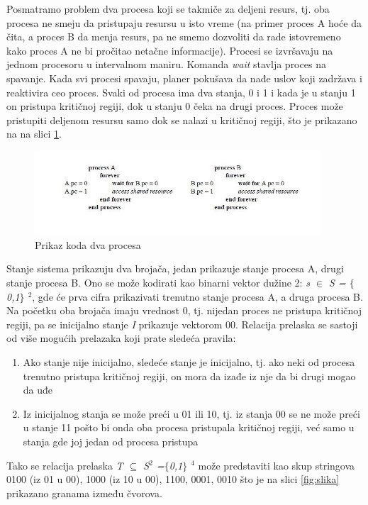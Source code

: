 \documentclass[a4paper]{article}
\begin{document}
Posmatramo problem dva procesa koji se takmiče za deljeni resurs, tj. oba procesa  ne smeju  da pristupaju resursu u isto vreme (na primer proces A hoće da čita, a proces B da menja resurs, pa ne smemo dozvoliti da rade istovremeno kako proces A ne bi pročitao netačne informacije). Procesi se izvršavaju na jednom procesoru u intervalnom maniru.  Komanda \textit{wait} stavlja proces na spavanje. Kada svi procesi spavaju, planer pokušava da nađe uslov koji zadržava i reaktivira ceo proces. Svaki od procesa ima dva stanja, 0 i 1 i kada je u stanju 1 on pristupa kritičnoj regiji, dok u stanju 0 čeka na drugi proces. Proces može pristupiti deljenom resursu samo dok se nalazi u kritičnoj regiji, što je prikazano na na slici \ref{fig:slika0}.

\begin{figure}[h!]
\begin{center}
\includegraphics[width=0.95\textwidth]{slika0}
\end{center}
\caption{Prikaz koda dva procesa}
\label{fig:slika0}
\end{figure}

Stanje sistema prikazuju dva brojača, jedan prikazuje stanje procesa A, drugi stanje procesa B. Ono se može kodirati kao binarni vektor dužine 2:
\textit{s $\in$ S = $\lbrace$0,1$\rbrace$ $^{2}$}, gde će prva cifra prikazivati trenutno stanje procesa A, a druga procesa B. Na početku oba brojača imaju vrednost 0, tj. nijedan proces ne 
pristupa kritičnoj regiji, pa se inicijalno stanje \textit{I} prikazuje vektorom 00. Relacija prelaska se sastoji od više
 mogućih prelazaka koji prate sledeća pravila: 
\begin{enumerate}
\item { Ako stanje nije inicijalno, sledeće stanje je inicijalno, 
	tj. ako neki od procesa trenutno pristupa kritičnoj regiji, on mora da izađe iz nje da bi drugi mogao da uđe}
\item { Iz inicijalnog stanja se može preći u 01 ili 10, 
	tj. iz stanja 00 se ne može preći u stanje 11 pošto bi onda oba procesa pristupala kritičnoj regiji, već samo u stanja gde joj jedan od procesa pristupa}
\end{enumerate}
Tako se relacija prelaska \textit{ T $\subseteq$ S$^{2}$ =$\lbrace$0,1$\rbrace$ $^{4}$} može predstaviti kao skup stringova 0100 (iz 01 u 00), 1000 (iz 10 u 00), 1100, 0001, 0010 što je na slici \ref{fig:slika} prikazano granama između čvorova.
\end{document}
